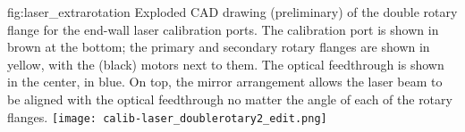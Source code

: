 \begin{dunefigure}{fig:laser_extrarotation}
{Exploded CAD drawing (preliminary) of the double rotary flange for the end-wall laser calibration ports. The calibration port is shown in brown at the bottom; the primary and secondary rotary flanges are shown in yellow,  with the (black) motors next to them. The optical feedthrough is shown in the center, in blue. On top, the mirror arrangement allows the laser beam to be aligned with the optical feedthrough no matter the angle of each of the rotary flanges.}
\texttt{[image: calib-laser\_doublerotary2\_edit.png]}
\end{dunefigure}




% 
% 

